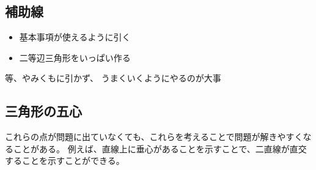 \documentclass[uplatex,dvipdfmx]{jsbook}
\begin{document}
\subsection{補助線}
\begin{itemize}
    \item 基本事項が使えるように引く
    \item 二等辺三角形をいっぱい作る
\end{itemize}
等、やみくもに引かず、
うまくいくようにやるのが大事

\subsection{三角形の五心}

これらの点が問題に出ていなくても、これらを考えることで問題が解きやすくなることがある。
例えば、直線上に垂心があることを示すことで、二直線が直交することを示すことができる。
\end{document}
